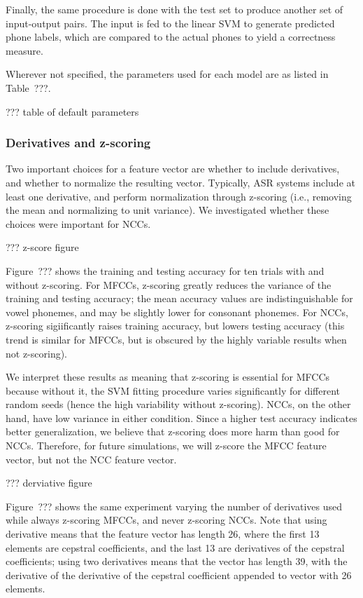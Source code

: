Finally, the same procedure is done
with the test set to produce another
set of input-output pairs.
The input is fed to the linear SVM
to generate predicted phone labels,
which are compared to the actual phones
to yield a correctness measure.

Wherever not specified,
the parameters used for each model
are as listed in Table~???.

??? table of default parameters

\subsubsection{Derivatives and z-scoring}

Two important choices for a feature vector
are whether to include derivatives,
and whether to normalize the resulting vector.
Typically, ASR systems include at least
one derivative, and perform normalization
through z-scoring
(i.e., removing the mean
and normalizing to unit variance).
We investigated whether these
choices were important for NCCs.

??? z-score figure

Figure~??? shows
the training and testing accuracy
for ten trials
with and without z-scoring.
For MFCCs,
z-scoring greatly reduces the variance
of the training and testing accuracy;
the mean accuracy values
are indistinguishable for
vowel phonemes,
and may be slightly lower
for consonant phonemes.
For NCCs,
z-scoring sigiificantly
raises training accuracy,
but lowers testing accuracy
(this trend is similar for MFCCs,
but is obscured by the
highly variable results
when not z-scoring).

We interpret these results
as meaning that z-scoring is essential
for MFCCs because without it,
the SVM fitting procedure
varies significantly for
different random seeds
(hence the high variability without z-scoring).
NCCs, on the other hand,
have low variance in either condition.
Since a higher test accuracy indicates
better generalization,
we believe that z-scoring
does more harm than good for NCCs.
Therefore, for future simulations,
we will z-score the MFCC feature vector,
but not the NCC feature vector.

??? derviative figure

Figure~??? shows
the same experiment
varying the number of derivatives used
while always z-scoring MFCCs,
and never z-scoring NCCs.
Note that using derivative means
that the feature vector has
length 26,
where the first 13 elements
are cepstral coefficients,
and the last 13 are derivatives
of the cepstral coefficients;
using two derivatives means that
the vector has length 39,
with the derivative of the
derivative of the cepstral coefficient
appended to vector with 26 elements.

